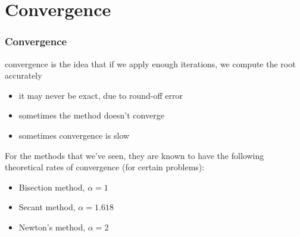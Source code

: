 \documentclass{if-beamer}
\begin{document}
\section{Convergence}
\begin{frame}
\frametitle{Convergence}
convergence is the idea that if we apply enough iterations, we compute the root accurately
\begin{itemize}
	\item it may never be exact, due to round-off error
	\item sometimes the method doesn't converge 
	\item sometimes convergence is slow
\end{itemize}
For the methods that we've seen, they are known to have the following
theoretical rates of convergence (for certain problems):
\begin{itemize}
	\item Bisection method, $\alpha = 1$
	\item Secant method, $\alpha = 1.618$
	\item Newton's method, $\alpha = 2$
\end{itemize}
\end{frame}
\end{document}
